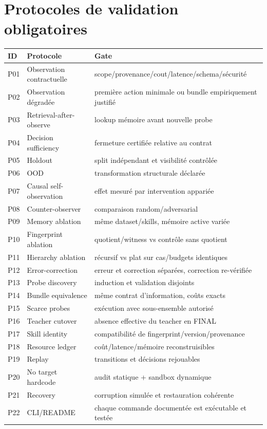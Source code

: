 \documentclass[11pt,a4paper]{report}
\begin{document}
\chapter{Protocoles de validation obligatoires}
\begin{longtable}{p{}p{}p{}}
\toprule ID & Protocole & Gate \\ \midrule
P01 & Observation contractuelle & scope/provenance/cout/latence/schema/sécurité \\
P02 & Observation dégradée & première action minimale ou bundle empiriquement justifié \\
P03 & Retrieval-after-observe & lookup mémoire avant nouvelle probe \\
P04 & Decision sufficiency & fermeture certifiée relative au contrat \\
P05 & Holdout & split indépendant et visibilité contrôlée \\
P06 & OOD & transformation structurale déclarée \\
P07 & Causal self-observation & effet mesuré par intervention appariée \\
P08 & Counter-observer & comparaison random/adversarial \\
P09 & Memory ablation & même dataset/skills, mémoire active variée \\
P10 & Fingerprint ablation & quotient/witness vs contrôle sans quotient \\
P11 & Hierarchy ablation & récursif vs plat sur cas/budgets identiques \\
P12 & Error-correction & erreur et correction séparées, correction re-vérifiée \\
P13 & Probe discovery & induction et validation disjoints \\
P14 & Bundle equivalence & même contrat d'information, coûts exacts \\
P15 & Scarce probes & exécution avec sous-ensemble autorisé \\
P16 & Teacher cutover & absence effective du teacher en FINAL \\
P17 & Skill identity & compatibilité de fingerprint/version/provenance \\
P18 & Resource ledger & coût/latence/mémoire reconstruisibles \\
P19 & Replay & transitions et décisions rejouables \\
P20 & No target hardcode & audit statique + sandbox dynamique \\
P21 & Recovery & corruption simulée et restauration cohérente \\
P22 & CLI/README & chaque commande documentée est exécutable et testée \\
\bottomrule
\end{longtable}
\end{document}
